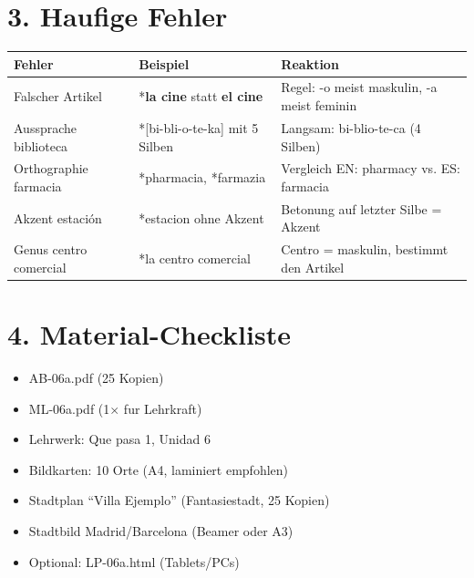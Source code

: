 \documentclass[11pt, a4paper]{article}
\newcommand{\fachfarbe}{spanisch}
\newcommand{\sequenz}{06}
\newcommand{\block}{a}
\newcommand{\lerngruppengroesse}{25}
\newcommand{\es}[1]{\textcolor{\fachfarbe}{\textbf{#1}}}
\begin{document}

\section*{3. Haufige Fehler}

\begin{fehlerbox}
\begin{tabularx}{\textwidth}{|l|X|X|}
\hline
\textbf{Fehler} & \textbf{Beispiel} & \textbf{Reaktion} \\
\hline
Falscher Artikel & *\es{la cine} statt \es{el cine} & Regel: -o meist maskulin, -a meist feminin \\
\hline
Aussprache biblioteca & *[bi-bli-o-te-ka] mit 5 Silben & Langsam: bi-blio-te-ca (4 Silben) \\
\hline
Orthographie farmacia & *pharmacia, *farmazia & Vergleich EN: pharmacy vs. ES: farmacia \\
\hline
Akzent estación & *estacion ohne Akzent & Betonung auf letzter Silbe = Akzent \\
\hline
Genus centro comercial & *la centro comercial & Centro = maskulin, bestimmt den Artikel \\
\hline
\end{tabularx}
\end{fehlerbox}


\section*{4. Material-Checkliste}

\begin{materialbox}
\begin{itemize}[label=$\square$]
    \item AB-\sequenz\block.pdf (\lerngruppengroesse{} Kopien)
    \item ML-\sequenz\block.pdf (1$\times$ fur Lehrkraft)
    \item Lehrwerk: Que pasa 1, Unidad 6
    \item Bildkarten: 10 Orte (A4, laminiert empfohlen)
    \item Stadtplan ``Villa Ejemplo'' (Fantasiestadt, \lerngruppengroesse{} Kopien)
    \item Stadtbild Madrid/Barcelona (Beamer oder A3)
    \item Optional: LP-\sequenz\block.html (Tablets/PCs)
\end{itemize}
\end{materialbox}
\end{document}
